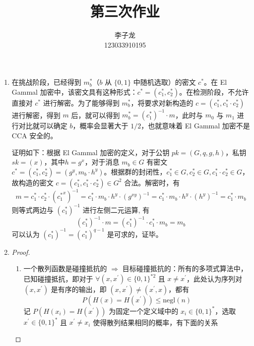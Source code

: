 \documentclass{sjtuarticle}
\title{第三次作业}
\author{李子龙\\123033910195}
\begin{document}
\maketitle
\begin{enumerate}
    \item \begin{solution}
        在挑战阶段，已经得到 $m_b^*$（$b$ 从 $\{0,1\}$ 中随机选取）的密文 $c^*$。在 El Gammal 加密中，该密文具有这种形式：$c^*=(c_1^*,c_2^*)$。在检测阶段，不允许直接对 $c^*$ 进行解密。为了能够得到 $m_b^*$，将要求对新构造的 $c=(c_1^*,c_1^*\cdot c_2^*)$ 进行解密，得到 $m$ 后，就可以得到 $m_b^*=(c_1^*)^{-1}\cdot m$，此时与 $m_0$ 与 $m_1$ 进行对比就可以确定 $b$，概率会显著大于 $1/2$，也就意味着 El Gammal 加密不是 CCA 安全的。

        证明如下：根据 El Gammal 加密的定义，对于公钥 $\mathit{pk}=(G,q,g,h)$，私钥 $\mathit{sk}=(x)$，其中$h=g^x$，对于消息 $m_b\in G$ 有密文 $c^*=(c_1^*,c_2^*)=(g^y,m_b\cdot h^y)$。根据群的封闭性，$c_1^*\in G,c_2^*\in G, c_1^*\cdot c_2^*\in G$，故构造的密文 $c=(c_1^*,c_1^*\cdot c_2^*)\in G^2$ 合法。解密时，有
        \begin{equation*}
            m = c_1^* \cdot c_2^*\cdot ({c_1^*}^x)^{-1}=c_1^*\cdot m_b\cdot h^y\cdot (g^{xy})^{-1} = c_1^* \cdot m_b\cdot h^y\cdot (h^y)^{-1}=c_1^*\cdot m_b
        \end{equation*}
        则等式两边与 $(c_1^*)^{-1}$ 进行左侧二元运算, 有
        \begin{equation*}
            (c_1^*)^{-1}\cdot m = (c_1^*)^{-1}\cdot c_1^*\cdot m_b = m_b
        \end{equation*}
        可以认为 $(c_1^*)^{-1}=(c_1^*)^{q-1}$ 是可求的，证毕。
    \end{solution}
    \item \begin{proof}
        \begin{enumerate}
            \item 一个散列函数是碰撞抵抗的 $\Rightarrow$ 目标碰撞抵抗的：所有的多项式算法中，已知碰撞抵抗，即对于 $\forall (x,x^\prime)\in \{0,1\}^{*2}$ 且 $x\neq x^\prime$，此处认为序列对 $(x,x^\prime)$ 是有序的输出，即 $(x,x^\prime)\neq (x^\prime,x)$，都有
            \begin{equation}\label{eq:cr}
                P\left(H(x)=H(x^\prime)\right)\leq \text{negl}(n)
            \end{equation}
            记 $P(H(x_i)=H(x^\prime))$ 为固定一个定义域中的 $x_i\in \{0,1\}^*$，选取 $x^\prime\in \{0,1\}^*$ 且 $x^\prime\neq x_i$ 使得散列结果相同的概率，有下面的关系

\end{enumerate}
\end{proof}
\end{enumerate}
\end{document}
